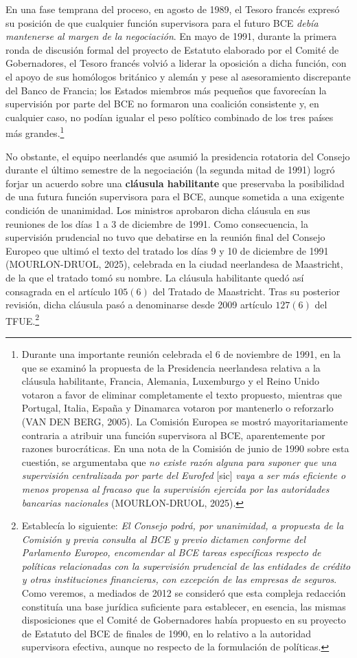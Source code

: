\documentclass[10pt,a4paper]{article}
\begin{document}
{En una fase temprana del proceso, en agosto de 1989, el Tesoro francés expresó su posición de que cualquier función supervisora para el futuro BCE \textit{debía mantenerse al margen de la negociación}. En mayo de 1991, durante la primera ronda de discusión formal del proyecto de Estatuto elaborado por el Comité de Gobernadores, el Tesoro francés volvió a liderar la oposición a dicha función, con el apoyo de sus homólogos británico y alemán y pese al asesoramiento discrepante del Banco de Francia; los Estados miembros más pequeños que favorecían la supervisión por parte del BCE no formaron una coalición consistente y, en cualquier caso, no podían igualar el peso político combinado de los tres países más grandes.\footnote{%
    Durante una importante reunión celebrada el 6 de noviembre de 1991, en la que se examinó la propuesta de la Presidencia neerlandesa relativa a la cláusula habilitante, Francia, Alemania, Luxemburgo y el Reino Unido votaron a favor de eliminar completamente el texto propuesto, mientras que Portugal, Italia, España y Dinamarca votaron por mantenerlo o reforzarlo (VAN DEN BERG, 2005). La Comisión Europea se mostró mayoritariamente contraria a atribuir una función supervisora al BCE, aparentemente por razones burocráticas. En una nota de la Comisión de junio de 1990 sobre esta cuestión, se argumentaba que \textit{no existe razón alguna para suponer que una supervisión centralizada por parte del Eurofed} [sic] \textit{vaya a ser más eficiente o menos propensa al fracaso que la supervisión ejercida por las autoridades bancarias nacionales} (MOURLON-DRUOL, 2025).
} 

No obstante, el equipo neerlandés que asumió la presidencia rotatoria del Consejo durante el último semestre de la negociación (la segunda mitad de 1991) logró forjar un acuerdo sobre una \textbf{cláusula habilitante} que preservaba la posibilidad de una futura función supervisora para el BCE, aunque sometida a una exigente condición de unanimidad. Los ministros aprobaron dicha cláusula en sus reuniones de los días 1 a 3 de diciembre de 1991. Como consecuencia, la supervisión prudencial no tuvo que debatirse en la reunión final del Consejo Europeo que ultimó el texto del tratado los días 9 y 10 de diciembre de 1991 (MOURLON-DRUOL, 2025), celebrada en la ciudad neerlandesa de Maastricht, de la que el tratado tomó su nombre. La cláusula habilitante quedó así consagrada en el artículo $105(6)$ del Tratado de Maastricht. Tras su posterior revisión, dicha cláusula pasó a denominarse desde 2009 artículo $127(6)$ del TFUE.\footnote{%
    Establecía lo siguiente: \textit{El Consejo podrá, por unanimidad, a propuesta de la Comisión y previa consulta al BCE y previo dictamen conforme del Parlamento Europeo, encomendar al BCE tareas específicas respecto de políticas relacionadas con la supervisión prudencial de las entidades de crédito y otras instituciones financieras, con excepción de las empresas de seguros}. Como veremos, a mediados de 2012 se consideró que esta compleja redacción constituía una base jurídica suficiente para establecer, en esencia, las mismas disposiciones que el Comité de Gobernadores había propuesto en su proyecto de Estatuto del BCE de finales de 1990, en lo relativo a la autoridad supervisora efectiva, aunque no respecto de la formulación de políticas.
}

}
\end{document}
